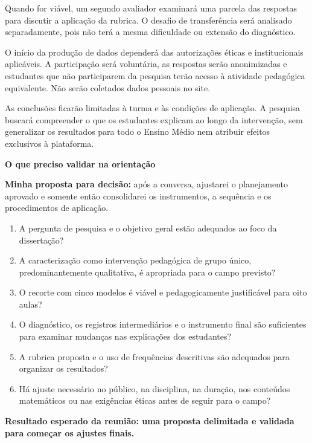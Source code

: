 \documentclass[11pt,a4paper]{article}
\newcommand{\titulo}[1]{\vspace{7pt}{\large\bfseries\color{azul}#1}\par\vspace{2pt}}
\newcommand{\caixa}[1]{\begingroup\setlength{\fboxsep}{8pt}\colorbox{azulclaro}{\parbox{\dimexpr\linewidth-2\fboxsep\relax}{#1}}\endgroup}
\begin{document}
Quando for viável, um segundo avaliador examinará uma parcela das respostas para discutir a aplicação da rubrica. O desafio de transferência será analisado separadamente, pois não terá a mesma dificuldade ou extensão do diagnóstico.

\titulo{6. Cuidados éticos e limites}

O início da produção de dados dependerá das autorizações éticas e institucionais aplicáveis. A participação será voluntária, as respostas serão anonimizadas e estudantes que não participarem da pesquisa terão acesso à atividade pedagógica equivalente. Não serão coletados dados pessoais no site.

As conclusões ficarão limitadas à turma e às condições de aplicação. A pesquisa buscará compreender o que os estudantes explicam ao longo da intervenção, sem generalizar os resultados para todo o Ensino Médio nem atribuir efeitos exclusivos à plataforma.

\newpage

\begin{center}
  {\LARGE\bfseries\color{azul} O que preciso validar na orientação}
\end{center}

\caixa{\textbf{Minha proposta para decisão:} após a conversa, ajustarei o planejamento aprovado e somente então consolidarei os instrumentos, a sequência e os procedimentos de aplicação.}

\begin{enumerate}[label=\textbf{\arabic*.}]
  \item A pergunta de pesquisa e o objetivo geral estão adequados ao foco da dissertação?
  \item A caracterização como intervenção pedagógica de grupo único, predominantemente qualitativa, é apropriada para o campo previsto?
  \item O recorte com cinco modelos é viável e pedagogicamente justificável para oito aulas?
  \item O diagnóstico, os registros intermediários e o instrumento final são suficientes para examinar mudanças nas explicações dos estudantes?
  \item A rubrica proposta e o uso de frequências descritivas são adequados para organizar os resultados?
  \item Há ajuste necessário no público, na disciplina, na duração, nos conteúdos matemáticos ou nas exigências éticas antes de seguir para o campo?
\end{enumerate}

\vfill
\begin{center}
  \textcolor{verde}{\large\bfseries Resultado esperado da reunião: uma proposta delimitada e validada para começar os ajustes finais.}
\end{center}
\end{document}
